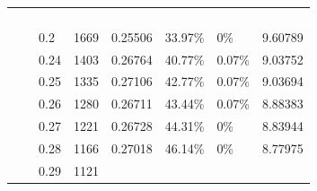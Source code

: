 {\begin{longtable}[c]{|llllllll|}
  \multicolumn{1}{l|}{} &
  \multicolumn{1}{l|}{} &
  \multicolumn{1}{l|}{} &
  \multicolumn{1}{l|}{} & \\
\multicolumn{1}{|l|}{} &
  \multicolumn{1}{l|}{} &
  \multicolumn{1}{l|}{} &
  \multicolumn{1}{l|}{} &
  \multicolumn{1}{l|}{} &
  \multicolumn{1}{l|}{} &
  \multicolumn{1}{l|}{} & \\
\multicolumn{1}{|l|}{} &
  \multicolumn{1}{l|}{} &
  \multicolumn{1}{l|}{} &
  \multicolumn{1}{l|}{} &
  \multicolumn{1}{l|}{} &
  \multicolumn{1}{l|}{} &
  \multicolumn{1}{l|}{} & \\
\multicolumn{1}{|l|}{} &
  \multicolumn{1}{l|}{} &
  \multicolumn{1}{l|}{} &
  \multicolumn{1}{l|}{} &
  \multicolumn{1}{l|}{} &
  \multicolumn{1}{l|}{} &
  \multicolumn{1}{l|}{} & \\ \hline
\endfirsthead
%
\endhead
%
%
\multicolumn{1}{|l|}{} &
  \multicolumn{1}{l|}{} &
  \multicolumn{1}{l|}{0.2} &
  \multicolumn{1}{l|}{1669} &
  \multicolumn{1}{l|}{0.25506} &
  \multicolumn{1}{l|}{33.97\%} &
  \multicolumn{1}{l|}{0\%} &
  9.60789 \\ \cline{3-8} 
\multicolumn{1}{|l|}{} &
  \multicolumn{1}{l|}{} &
  \multicolumn{1}{l|}{0.24} &
  \multicolumn{1}{l|}{1403} &
  \multicolumn{1}{l|}{0.26764} &
  \multicolumn{1}{l|}{40.77\%} &
  \multicolumn{1}{l|}{0.07\%} &
  9.03752 \\ \cline{3-8} 
\multicolumn{1}{|l|}{} &
  \multicolumn{1}{l|}{} &
  \multicolumn{1}{l|}{0.25} &
  \multicolumn{1}{l|}{1335} &
  \multicolumn{1}{l|}{0.27106} &
  \multicolumn{1}{l|}{42.77\%} &
  \multicolumn{1}{l|}{0.07\%} &
  9.03694 \\ \cline{3-8} 
\multicolumn{1}{|l|}{} &
  \multicolumn{1}{l|}{} &
  \multicolumn{1}{l|}{0.26} &
  \multicolumn{1}{l|}{1280} &
  \multicolumn{1}{l|}{0.26711} &
  \multicolumn{1}{l|}{43.44\%} &
  \multicolumn{1}{l|}{0.07\%} &
  8.88383 \\ \cline{3-8} 
\multicolumn{1}{|l|}{} &
  \multicolumn{1}{l|}{} &
  \multicolumn{1}{l|}{0.27} &
  \multicolumn{1}{l|}{1221} &
  \multicolumn{1}{l|}{0.26728} &
  \multicolumn{1}{l|}{44.31\%} &
  \multicolumn{1}{l|}{0\%} &
  8.83944 \\ \cline{3-8} 
\multicolumn{1}{|l|}{} &
  \multicolumn{1}{l|}{} &
  \multicolumn{1}{l|}{0.28} &
  \multicolumn{1}{l|}{1166} &
  \multicolumn{1}{l|}{0.27018} &
  \multicolumn{1}{l|}{46.14\%} &
  \multicolumn{1}{l|}{0\%} &
  8.77975 \\ \cline{3-8} 
\multicolumn{1}{|l|}{} &
  \multicolumn{1}{l|}{} &
  \multicolumn{1}{l|}{0.29} &
  \multicolumn{1}{l|}{1121} &

\end{longtable}}
